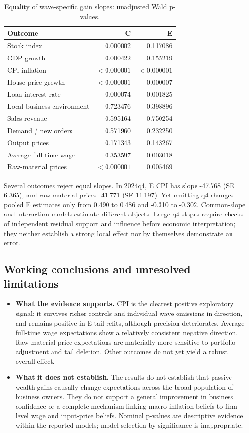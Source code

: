 \begin{table}[H]
\centering
\small
\setlength{\tabcolsep}{4pt}
\caption{Equality of wave-specific gain slopes: unadjusted Wald p-values.}
\begin{tabular}{lrr}
\toprule
Outcome & C & E \\
\midrule
Stock index & 0.000002 & 0.117086 \\
GDP growth & 0.000422 & 0.155219 \\
CPI inflation & $<0.000001$ & $<0.000001$ \\
House-price growth & $<0.000001$ & 0.000007 \\
Loan interest rate & 0.000074 & 0.001825 \\
Local business environment & 0.723476 & 0.398896 \\
Sales revenue & 0.595164 & 0.750254 \\
Demand / new orders & 0.571960 & 0.232250 \\
Output prices & 0.171343 & 0.143267 \\
Average full-time wage & 0.353597 & 0.003018 \\
Raw-material prices & $<0.000001$ & 0.005469 \\
\bottomrule
\end{tabular}
\end{table}
\noindent Several outcomes reject equal slopes. In 2024q4, E CPI has slope -47.768 (SE 6.365), and raw-material prices -41.771 (SE 11.197). Yet omitting q4 changes pooled E estimates only from 0.490 to 0.486 and -0.310 to -0.302. Common-slope and interaction models estimate different objects. Large q4 slopes require checks of independent residual support and influence before economic interpretation; they neither establish a strong local effect nor by themselves demonstrate an error.
\subsection{Working conclusions and unresolved limitations}
\begin{itemize}
\item \textbf{What the evidence supports.} CPI is the clearest positive exploratory signal: it survives richer controls and individual wave omissions in direction, and remains positive in E tail refits, although precision deteriorates. Average full-time wage expectations show a relatively consistent negative direction. Raw-material price expectations are materially more sensitive to portfolio adjustment and tail deletion. Other outcomes do not yet yield a robust overall effect.

\item \textbf{What it does not establish.} The results do not establish that passive wealth gains causally change expectations across the broad population of business owners. They do not support a general improvement in business confidence or a complete mechanism linking macro inflation beliefs to firm-level wage and input-price beliefs. Nominal p-values are descriptive evidence within the reported models; model selection by significance is inappropriate.
\end{itemize}

